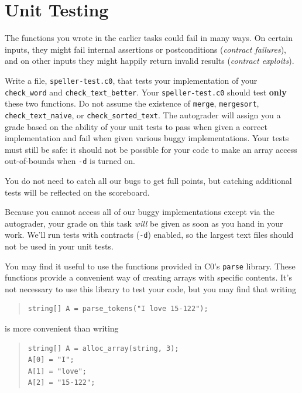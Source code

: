\documentclass[12pt]{exam}
\begin{document}
\newpage
\section{Unit Testing}
\label{ref:unit-test}

The functions you wrote in the earlier tasks could fail in many
ways. On certain inputs, they might fail internal assertions or
postconditions (\emph{contract failures}), and on other inputs they
might happily return invalid results (\emph{contract exploits}).

\begin{task}[4]
\label{task:unit-test}
Write a file, \lstinline'speller-test.c0', that tests your
implementation of your \lstinline'check_word' and
\lstinline'check_text_better'.  Your \lstinline'speller-test.c0'
should test \textbf{only} these two functions.  Do not assume the
existence of \lstinline'merge', \lstinline'mergesort',
\lstinline'check_text_naive', or \lstinline'check_sorted_text'.  The
autograder will assign you a grade based on the ability of your unit
tests to pass when given a correct implementation and fail when given
various buggy implementations.  Your tests must still be safe: it
should not be possible for your code to make an array access
out-of-bounds when \lstinline'-d' is turned on.

  You do not need to catch all our bugs to get full points, but
  catching additional tests will be reflected on the scoreboard.
\end{task}

Because you cannot access all of our buggy implementations except via
the autograder, your grade on this task \emph{will} be given as soon
as you hand in your work.
We'll run tests with contracts (\lstinline'-d') enabled, so the largest
text files should not be used in your unit tests.

You may find it useful to use the functions provided in C0's
\lstinline'parse' library. These functions provide a convenient way
of creating arrays with specific contents.  It's not necessary to use
this library to test your code, but you may find that writing
\begin{quote}
\begin{lstlisting}[belowskip=0pt, basicstyle=\smallbasicstyle]
string[] A = parse_tokens("I love 15-122");
\end{lstlisting}
\end{quote}
is more convenient than writing
\begin{quote}
\begin{lstlisting}[belowskip=0pt, basicstyle=\smallbasicstyle]
string[] A = alloc_array(string, 3);
A[0] = "I";
A[1] = "love";
A[2] = "15-122";
\end{lstlisting}
\end{quote}
\end{document}
